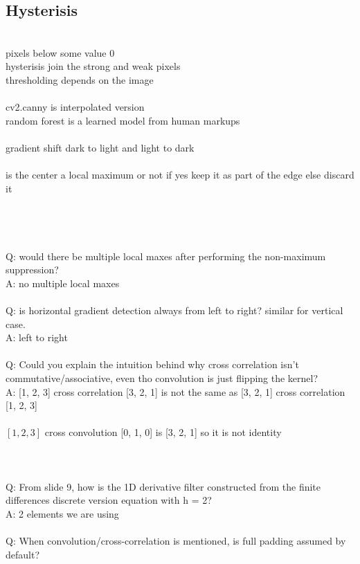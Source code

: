 \documentclass[11pt]{article}
\begin{document}
\subsection*{Hysterisis}\\
pixels below some value 0\\
hysterisis join the strong and weak pixels\\
thresholding depends on the image\\
\\
cv2.canny is interpolated version
\\
random forest is a learned model from human markups\\
\\gradient shift dark to light and light to dark
\\\\
is the center a local maximum or not
if yes keep it as part of the edge else discard it
\\
\\\\
\
\\\\
Q: would there be multiple local maxes after performing the non-maximum suppression?\\
A: no multiple local maxes
\\\\
Q: is horizontal gradient detection always from left to right? similar for vertical case.\\
A: left to right\\
\\
Q: Could you explain the intuition behind why cross correlation isn't commutative/associative, even tho convolution is just flipping the kernel?
\\
A: [1, 2, 3] cross correlation [3, 2, 1] is not the same as [3, 2, 1] cross correlation [1, 2, 3]
\\\\
$[1, 2, 3]$ cross convolution [0, 1, 0] is [3, 2, 1] so it is not identity
\\
\\\\\\
Q: From slide 9, how is the 1D derivative filter constructed from the finite differences discrete version equation with h = 2?\\
A: 2 elements we are using 
\\\\
Q: When convolution/cross-correlation is mentioned, is full padding assumed by default?\\
\end{document}

